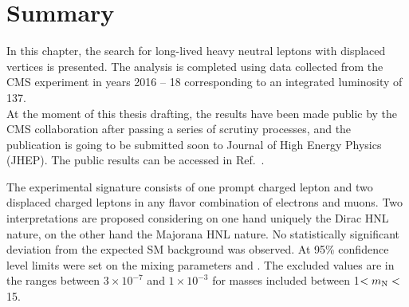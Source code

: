 \clearpage
\section{Summary}
In this chapter, the search for long-lived heavy neutral leptons with displaced
vertices is presented. The analysis is completed using data collected from the
CMS experiment in years 2016 -- 18 corresponding to an integrated
luminosity of 137\fbinv.\\
At the moment of this thesis drafting, the results have been made
public by the CMS collaboration after passing a series of scrutiny
processes, and the publication is going to be submitted soon to Journal
of High Energy Physics (JHEP). The public results can be accessed in
Ref.~\cite{CMS-PAS-EXO-20-009}.

The experimental signature consists of one prompt charged lepton and two displaced
charged leptons in any flavor combination of electrons
and muons. Two interpretations are proposed considering on one hand uniquely the
Dirac HNL nature, on the other hand the Majorana HNL nature. 
No statistically significant deviation from the expected
SM background was observed. At 95\% confidence level limits were set on the mixing
parameters \mixpare and \mixparm.
The excluded values are in the
ranges between $3\times 10^{-7}$ and $1\times 10^{-3}$ for masses included
between 1\GeV $< m_\mathrm{N} <$ 15\GeV. 

